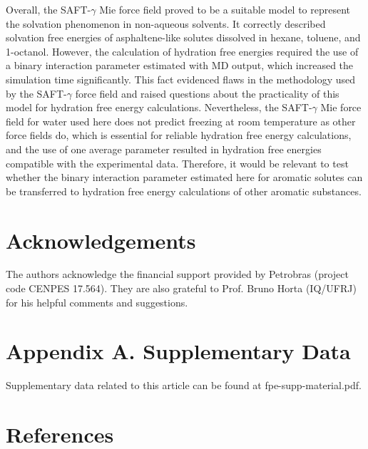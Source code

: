 \documentclass[preprint]{elsarticle}
\begin{document}
	Overall, the SAFT-$\gamma$ Mie force field proved to be a suitable model to represent the solvation phenomenon in non-aqueous solvents. It correctly described solvation free energies of asphaltene-like solutes dissolved in hexane, toluene, and 1-octanol. However, the calculation of hydration free energies required the use of a binary interaction parameter estimated with MD output, which increased the simulation time significantly. This fact evidenced flaws in the methodology used by the SAFT-$\gamma$ force field and raised questions about the practicality of this model for hydration free energy calculations. Nevertheless, the SAFT-$\gamma$ Mie force field for water used here does not predict freezing at room temperature as other force fields do, which is essential for reliable hydration free energy calculations, and the use of one average parameter resulted in hydration free energies compatible with the experimental data.
	Therefore, it would be relevant to test whether the binary interaction parameter estimated here for aromatic solutes can be transferred to hydration free energy calculations of other aromatic substances.

	\section*{Acknowledgements}
	
	The authors acknowledge the financial support provided by Petrobras (project code CENPES 17.564). They are also grateful to Prof. Bruno Horta (IQ/UFRJ) for his helpful comments and suggestions.
	
	\section*{Appendix A. Supplementary Data}
	
	Supplementary data related to this article can be found at fpe-supp-material.pdf.
	
	\section*{References}
	
	
	
\end{document}
